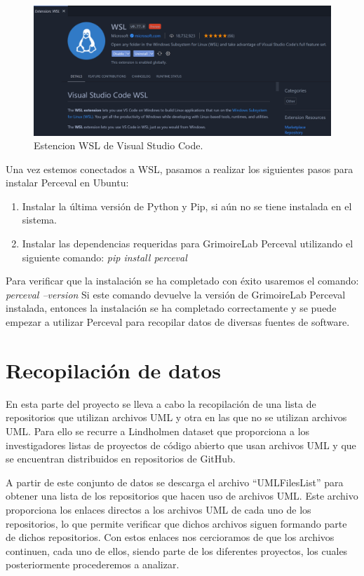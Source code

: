 \documentclass[a4paper, 12pt]{book}
\begin{document}
\begin{figure}
  \centering
  \includegraphics[width=15cm, keepaspectratio]{img/extension_wsl.PNG}
  \caption{Estencion WSL de Visual Studio Code.}\label{fig:estensionwsl}
\end{figure}

Una vez estemos conectados a WSL, pasamos a realizar los siguientes pasos para instalar Perceval en Ubuntu:
\begin{enumerate}
  \item Instalar la última versión de Python y Pip, si aún no se tiene instalada en el sistema.
  \item Instalar las dependencias requeridas para GrimoireLab Perceval utilizando el siguiente comando: \emph{pip install perceval}
\end{enumerate}

Para verificar que la instalación se ha completado con éxito usaremos el comando: \emph{perceval --version} 
Si este comando devuelve la versión de GrimoireLab Perceval instalada, entonces la instalación se ha completado correctamente y se puede empezar a utilizar Perceval para recopilar datos de diversas fuentes de software.

\section{Recopilación de datos} %
\label{sec:recopilación de datos}

En esta parte del proyecto se lleva a cabo la recopilación de una lista de repositorios que utilizan archivos UML y otra en las que no se utilizan archivos UML.
Para ello se recurre a Lindholmen dataset que proporciona a los investigadores listas de proyectos de código abierto que usan archivos UML y que se encuentran distribuidos en repositorios de GitHub.

A partir de este conjunto de datos se descarga el archivo ``UMLFilesList'' para obtener una lista de los repositorios que hacen uso de archivos UML.
Este archivo proporciona los enlaces directos a los archivos UML de cada uno de los repositorios, lo que permite verificar que dichos archivos siguen formando parte de dichos repositorios.
Con estos enlaces nos cercioramos de que los archivos continuen, cada uno de ellos, siendo parte de los diferentes proyectos, los cuales posteriormente procederemos a analizar. 
\end{document}
